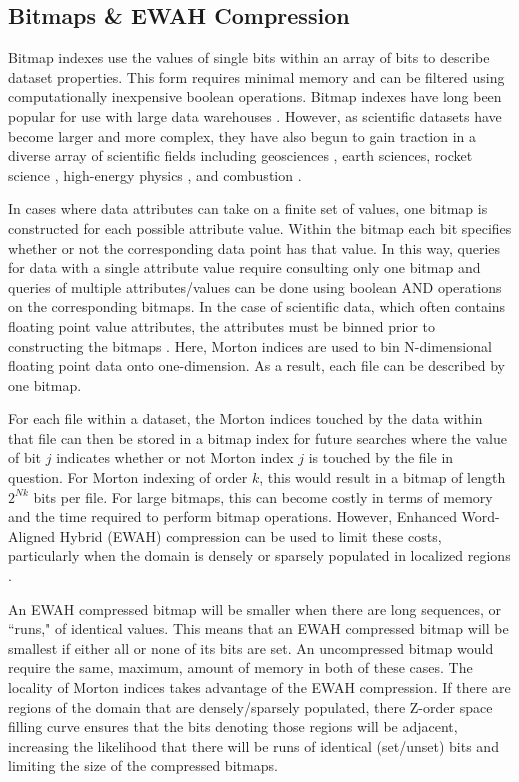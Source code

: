 \documentclass[apjl]{emulateapj}
\begin{document}
\subsection{Bitmaps \& EWAH Compression}
Bitmap indexes use the values of single bits within an array of bits to describe dataset properties. This form requires minimal memory and can be filtered using computationally inexpensive boolean operations. Bitmap indexes have long been popular for use with large data warehouses \citep{Wu1998,Chan1998,Chan1999}. However, as scientific datasets have become larger and more complex, they have also begun to gain traction in a diverse array of scientific fields including geosciences \citep{Malensek2014}, earth sciences, rocket science \citep{Sinha2006,Sinha2007}, high-energy physics \citep{Stockinger2000}, and combustion \citep{Wu2003}. 

In cases where data attributes can take on a finite set of values, one bitmap is constructed for each possible attribute value. Within the bitmap each bit specifies whether or not the corresponding data point has that value. In this way, queries for data with a single attribute value require consulting only one bitmap and queries of multiple attributes/values can be done using boolean AND operations on the corresponding bitmaps. In the case of scientific data, which often contains floating point value attributes, the attributes must be binned prior to constructing the bitmaps \citep{Yu1998,Shoshani1999,Stockinger2004}. Here, Morton indices are used to bin N-dimensional floating point data onto one-dimension. As a result, each file can be described by one bitmap.

For each file within a dataset, the Morton indices touched by the data within that file can then be stored in a bitmap index for future searches where the value of bit $j$ indicates whether or not Morton index $j$ is touched by the file in question. For Morton indexing of order $k$, this would result in a bitmap of length $2^{Nk}$ bits per file. For large bitmaps, this can become costly in terms of memory and the time required to perform bitmap operations. However, Enhanced Word-Aligned Hybrid (EWAH) compression can be used to limit these costs, particularly when the domain is densely or sparsely populated in localized regions \citep{Wu2001,Lemire2010,Kaser2016}. 

An EWAH compressed bitmap will be smaller when there are long sequences, or ``runs," of identical values. This means that an EWAH compressed bitmap will be smallest if either all or none of its bits are set. An uncompressed bitmap would require the same, maximum, amount of memory in both of these cases. The locality of Morton indices takes advantage of the EWAH compression. If there are regions of the domain that are densely/sparsely populated, there Z-order space filling curve ensures that the bits denoting those regions will be adjacent, increasing the likelihood that there will be runs of identical (set/unset) bits and limiting the size of the compressed bitmaps.
\end{document}
